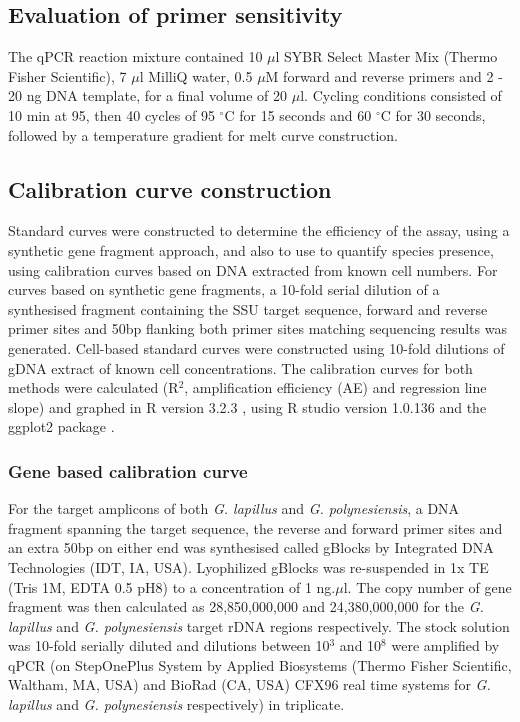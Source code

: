 \documentclass[12pt]{article}
\begin{document}
\subsection*{Evaluation of primer sensitivity}
The qPCR reaction mixture contained 10 $\mu$l SYBR Select Master Mix (Thermo Fisher Scientific), 7 $\mu$l MilliQ water, 0.5 $\mu$M forward and reverse primers and 2 - 20 ng DNA template, for a final volume of 20 $\mu$l. Cycling conditions consisted of 10 min at 95, then 40 cycles of 95 $^{\circ}$C for 15 seconds and 60 $^{\circ}$C for 30 seconds, followed by a temperature gradient for melt curve construction.
\subsection*{Calibration curve construction}
Standard curves were constructed to determine the efficiency of the assay, using a synthetic gene fragment approach, and also to use to quantify species presence, using calibration curves based on DNA extracted from known cell numbers. For curves based on synthetic gene fragments, a 10-fold serial dilution of a synthesised fragment containing the SSU target sequence, forward and reverse primer sites and 50bp flanking both primer sites matching sequencing results was generated. Cell-based standard curves were constructed using 10-fold dilutions of gDNA extract of known cell concentrations.
The calibration curves for both methods were calculated (R$^{2}$, amplification efficiency (AE) and regression line slope) and graphed in R version 3.2.3 \citep{rlang}, using R studio version 1.0.136 \citep{rstudio} and the ggplot2 package \citep{ggplot2}. 
\subsubsection*{Gene based calibration curve}
For the target amplicons of both \emph{G. lapillus} and \emph{G. polynesiensis}, a DNA fragment spanning the target sequence, the reverse and forward primer sites and an extra 50bp on either end was synthesised called gBlocks \textsuperscript{\textregistered} by Integrated DNA Technologies (IDT, IA, USA). Lyophilized gBlocks \textsuperscript{\textregistered} was re-suspended in 1x TE (Tris 1M, EDTA 0.5 pH8) to a concentration of 1 ng.$\mu$l. The copy number of gene fragment was then calculated as 28,850,000,000 and 24,380,000,000 for the \textit{G. lapillus} and \textit{G. polynesiensis} target rDNA regions respectively.
The stock solution was 10-fold serially diluted and dilutions between 10$^{3}$ and 10$^{8}$ were amplified by qPCR (on StepOnePlus System by Applied Biosystems (Thermo Fisher Scientific, Waltham, MA, USA) and BioRad (CA, USA) CFX96 real time systems for \emph{G. lapillus} and \emph{G. polynesiensis} respectively) in triplicate.
\end{document}
